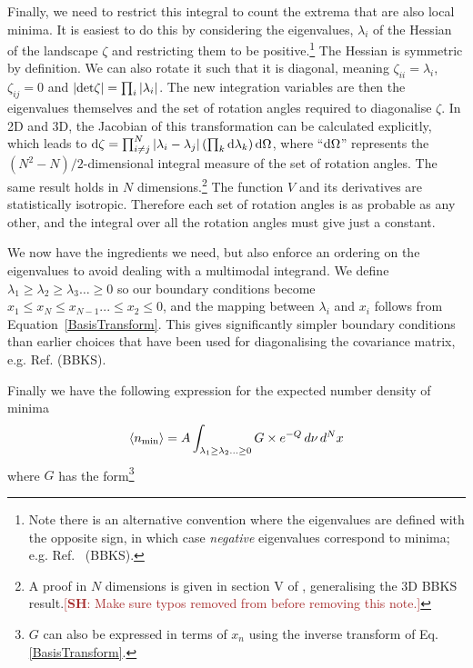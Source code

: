 \documentclass[12pt]{article}
\newcommand{\SH}[1]{\textcolor{brown}{[{\bf SH}: #1]}}
\begin{document}
Finally, we need to restrict this integral to count the extrema that are also local minima. It is easiest to do this by considering the eigenvalues, $\lambda_i$ of the Hessian of the landscape $\zeta$ and restricting them to be positive.\footnote{Note there is an alternative convention where the eigenvalues are defined with the opposite sign, in which case \emph{negative} eigenvalues correspond to minima; e.g. Ref.~\cite{BBKS} (BBKS).}  The Hessian is symmetric by definition. We can also rotate it such that it is diagonal, meaning  $\zeta_{ii}=\lambda_i$, $\zeta_{ij}=0$ and $|{\rm det} \zeta| = \prod_i |\lambda_i|$. The new integration variables are then the eigenvalues themselves and the set of rotation angles required to diagonalise $\zeta$.  In 2D and 3D, the Jacobian of this transformation can be calculated explicitly, which leads to  ${\rm d} \zeta = \prod_{i \neq j}^N |\lambda_i - \lambda_j|\left(\prod_k {\rm d}\lambda_k\right) {\rm d} \Omega$, where ``${\rm d}\Omega$'' represents the $(N^2-N)/2$-dimensional integral measure of the set of rotation angles. The same result holds in $N$ dimensions.\footnote{A proof in $N$ dimensions is given in section V of \cite{Easther2016}, generalising the 3D  BBKS result.\SH{Make sure typos removed from  \cite{Easther2016} before removing this note.}} The function $V$ and its derivatives are statistically isotropic. Therefore each set of rotation angles is as probable as any other, and the integral over all the rotation angles must give just a constant.

We now have  the ingredients we  need, but  also enforce an ordering on the eigenvalues to avoid dealing with a multimodal integrand.  We define  $\lambda_1 \geq \lambda_2 \geq \lambda_3 \ldots \geq 0$ so our boundary conditions become $x_1\leq x_N\leq x_{N-1} ... \leq x_2 \leq 0$, and the mapping between $\lambda_i$ and $x_i$  follows from Equation~\ref{BasisTransform}. This gives significantly simpler boundary conditions than earlier choices that have been used for diagonalising the covariance matrix, e.g. Ref.\cite{BBKS} (BBKS).

Finally we have the following expression for the expected number density of minima 
%
\begin{equation} \label{DensityOfPeaks}
\langle n_{{\rm min}} \rangle = A \int_{\lambda_1 \geq \lambda_2 \ldots \geq 0} G \times e^{-Q} \, d\nu \,d^Nx
\end{equation}
%
\noindent where $G$ has the form\footnote{$G$ can also be expressed in terms of $x_n$ using the inverse transform of Eq. \ref{BasisTransform}.}
\end{document}
